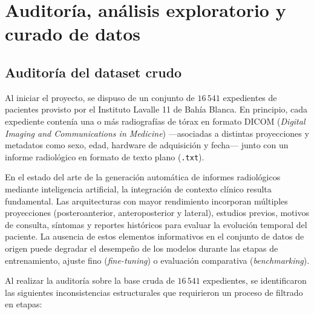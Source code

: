 \documentclass[../tesis.tex]{subfiles}
\begin{document}
\graphicspath{{../imagenes/}{imagenes/}}

\chapter{Auditoría, análisis exploratorio y curado de datos}

\section{Auditoría del dataset crudo}
\label{sec:auditoria_intro}

Al iniciar el proyecto, se dispuso de un conjunto de $16\,541$ expedientes de pacientes provisto por el Instituto Lavalle 11 de Bahía Blanca. En principio, cada expediente contenía una o más radiografías de tórax en formato DICOM (\textit{Digital Imaging and Communications in Medicine}) —asociadas a distintas proyecciones y metadatos como sexo, edad, hardware de adquisición y fecha— junto con un informe radiológico en formato de texto plano (\texttt{.txt}).

En el estado del arte de la generación automática de informes radiológicos mediante inteligencia artificial, la integración de contexto clínico resulta fundamental. Las arquitecturas con mayor rendimiento incorporan múltiples proyecciones (posteroanterior, anteroposterior y lateral), estudios previos, motivos de consulta, síntomas y reportes históricos para evaluar la evolución temporal del paciente. La ausencia de estos elementos informativos en el conjunto de datos de origen puede degradar el desempeño de los modelos durante las etapas de entrenamiento, ajuste fino (\textit{fine-tuning}) o evaluación comparativa (\textit{benchmarking}).

Al realizar la auditoría sobre la base cruda de $16\,541$ expedientes, se identificaron las siguientes inconsistencias estructurales que requirieron un proceso de filtrado en etapas:
\end{document}
